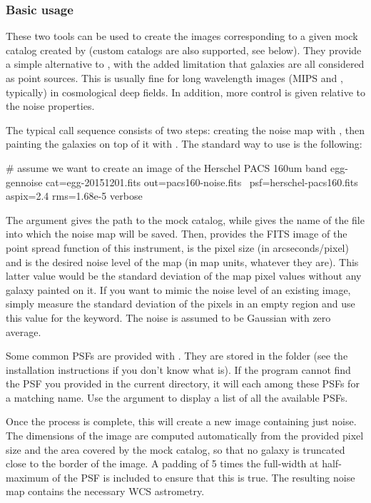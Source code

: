 \subsubsection{Basic usage}

These two tools can be used to create the images corresponding to a given mock catalog created by  (custom catalogs are also supported, see below). They provide a simple alternative to \skymaker, with the added limitation that galaxies are all considered as point sources. This is usually fine for long wavelength images (\spitzer MIPS and \herschel, typically) in cosmological deep fields. In addition, more control is given relative to the noise properties.

The typical call sequence consists of two steps: creating the noise map with , then painting the galaxies on top of it with . The standard way to use  is the following:
\begin{bashcode}
# assume we want to create an image of the Herschel PACS 160um band
egg-gennoise cat=egg-20151201.fits out=pacs160-noise.fits \
    psf=herschel-pacs160.fits aspix=2.4 rms=1.68e-5 verbose
\end{bashcode}
The argument  gives the path to the mock catalog, while  gives the name of the file into which the noise map will be saved. Then,  provides the FITS image of the point spread function of this instrument,  is the pixel size (in arcseconds/pixel) and  is the desired noise level of the map (in map units, whatever they are). This latter value would be the standard deviation of the map pixel values without any galaxy painted on it. If you want to mimic the noise level of an existing image, simply measure the standard deviation of the pixels in an empty region and use this value for the  keyword. The noise is assumed to be Gaussian with zero average.

Some common PSFs are provided with \egg. They are stored in the  folder (see the installation instructions if you don't know what  is). If the program cannot find the PSF you provided in the current directory, it will each among these PSFs for a matching name. Use the  argument to display a list of all the available PSFs.

Once the process is complete, this will create a new image containing just noise. The dimensions of the image are computed automatically from the provided pixel size and the area covered by the mock catalog, so that no galaxy is truncated close to the border of the image. A padding of 5 times the full-width at half-maximum of the PSF is included to ensure that this is true. The resulting noise map contains the necessary WCS astrometry.


